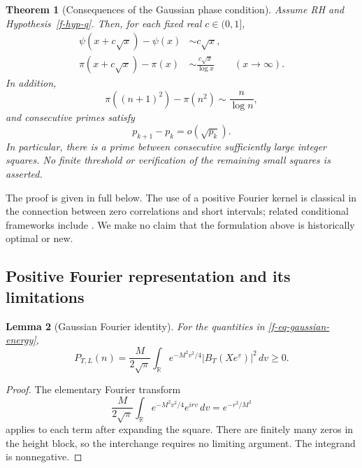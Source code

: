 \documentclass[11pt,a4paper]{article}
\newtheorem{theorem}{Theorem}[section]
\newtheorem{lemma}[theorem]{Lemma}
\theoremstyle{definition}
\theoremstyle{remark}
\begin{document}
\begin{theorem}[Consequences of the Gaussian phase condition]
\label{f-thm-q-prime-gaps}
Assume RH and Hypothesis~\ref{f-hyp-q}.  Then, for each fixed real
$c\in(0,1]$,
\begin{align}
 \psi(x+c\sqrt{x})-\psi(x)&\sim c\sqrt{x},
 \label{f-eq-short-psi}\\
 \pi(x+c\sqrt{x})-\pi(x)&\sim\frac{c\sqrt{x}}{\log x}
 \qquad(x\to\infty).
 \label{f-eq-short-primes}
\end{align}
In addition,
\begin{equation}
 \pi((n+1)^2)-\pi(n^2)\sim\frac n{\log n},
 \label{f-eq-squares-asymptotic}
\end{equation}
and consecutive primes satisfy
\begin{equation}
 p_{k+1}-p_k=o(\sqrt{p_k}).
 \label{f-eq-small-prime-gaps}
\end{equation}
In particular, there is a prime between consecutive sufficiently large
integer squares.  No finite threshold or verification of the remaining
small squares is asserted.
\end{theorem}

The proof is given in full below.  The use of a positive Fourier kernel is
classical in the connection between zero correlations and short intervals;
related conditional frameworks include \cite{f-lpz,f-gwx}.  We make no
claim that the formulation above is historically optimal or new.

\subsection{Positive Fourier representation and its limitations}
\label{f-sub-positive-kernel}

\begin{lemma}[Gaussian Fourier identity]
\label{f-lem-fourier-positive}
For the quantities in \eqref{f-eq-gaussian-energy},
\begin{equation}
 P_{T,L}(n)=\frac{M}{2\sqrt\pi}
 \int_{\mathbb R}e^{-M^2v^2/4}|B_T(Xe^v)|^2\,dv\ge0.
 \label{f-eq-positive-integral}
\end{equation}
\end{lemma}

\begin{proof}
The elementary Fourier transform
\[
 \frac{M}{2\sqrt\pi}\int_{\mathbb R}
 e^{-M^2v^2/4}e^{irv}\,dv=e^{-r^2/M^2}
\]
applies to each term after expanding the square.  There are finitely many
zeros in the height block, so the interchange requires no limiting
argument.  The integrand is nonnegative.
\end{proof}
\end{document}

